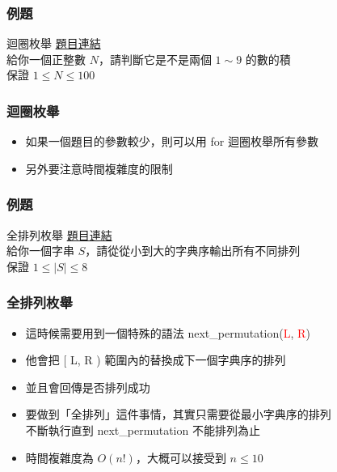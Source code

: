 \documentclass{beamer}
\begin{document}
\begin{frame}
    \frametitle{例題}
    \begin{block}{迴圈枚舉}
        \href{https://atcoder.jp/contests/abc144/tasks/abc144_b}{題目連結}\\
        給你一個正整數 $N$，請判斷它是不是兩個 $1 \sim 9$ 的數的積\\
        保證 $1 \leq N \leq 100$
    \end{block}
\end{frame}

\begin{frame}
    \frametitle{迴圈枚舉}
    \begin{itemize}
        \item 如果一個題目的參數較少，則可以用 for 迴圈枚舉所有參數
        \item 另外要注意時間複雜度的限制
    \end{itemize}
\end{frame}

\begin{frame}
    \frametitle{例題}
    \begin{block}{全排列枚舉}
        \href{https://cses.fi/problemset/task/1622}{題目連結}\\
        給你一個字串 $S$，請從從小到大的字典序輸出所有不同排列\\
        保證 $1 \leq |S| \leq 8$
    \end{block}
\end{frame}

\begin{frame}
    \frametitle{全排列枚舉}
    \begin{itemize}
        \item 這時候需要用到一個特殊的語法  next\_permutation(\textcolor{red}{L}, \textcolor{red}{R})
        \item 他會把 [ L, R ) 範圍內的替換成下一個字典序的排列
        \item 並且會回傳是否排列成功
        \vspace{0.5cm}
        \item<2-> 要做到「全排列」這件事情，其實只需要從最小字典序的排列\\
        不斷執行直到 next\_permutation 不能排列為止
        \item 時間複雜度為 $O(n!)$，大概可以接受到 $n \leq 10$
    \end{itemize}
\end{frame}
\end{document}
